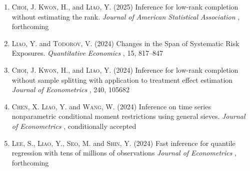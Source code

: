 \documentclass[11pt]{article}
\begin{document}
  \begin{enumerate}
  
   




  \item  \textsc{Choi, J.}   \textsc{\textsc{Kwon, H.}}, and \textsc{Liao, Y.}   (2025)  Inference for low-rank completion without estimating the rank.    {\it  { Journal of American Statistical Association}   },    forthcoming 

 
   \item   \textsc{\textsc{Liao, Y.}} and  \textsc{Todorov, V.} (2024)  Changes in the Span of Systematic Risk Exposures.     {\it  { Quantitative Economics}   }, 15,    817–847
		

	



  \item  \textsc{Choi, J.}   \textsc{\textsc{Kwon, H.}}, and \textsc{Liao, Y.}   (2024)  Inference for low-rank completion without sample splitting with application to treatment effect estimation     {\it  { Journal of Econometrics}   },   240, 105682
	
	


	
  \item  \textsc{Chen, X. }   \textsc{\textsc{Liao, Y.}} and  \textsc{Wang, W.} (2024)  Inference on time series nonparametric conditional moment
		restrictions using general sieves.     {\it  { Journal of Econometrics}   },   conditionally accepted 
		
		

		
		
		
		

  \item  \textsc{Lee, S., }   \textsc{\textsc{Liao, Y.}}, \textsc{Seo, M.} and \textsc{Shin, Y.} (2024)  Fast inference for quantile regression with tens of millions of observations   {\it  { Journal of Econometrics}   },   forthcoming 







\end{enumerate}
\end{document}
